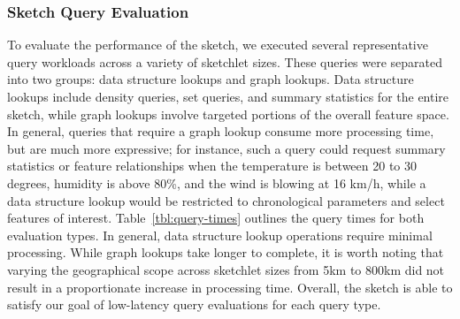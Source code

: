 \subsubsection{Sketch Query Evaluation}
To evaluate the performance of the sketch, we executed several representative query workloads across a variety of sketchlet sizes. These queries were separated into two groups: data structure lookups and graph lookups. Data structure lookups include density queries, set queries, and summary statistics for the entire sketch, while graph lookups involve targeted portions of the overall feature space. In general, queries that require a graph lookup consume more processing time, but are much more expressive; for instance, such a query could request summary statistics or feature relationships when the temperature is between 20 to 30 degrees, humidity is above 80\%, and the wind is blowing at 16 km/h, while a data structure lookup would be restricted to chronological parameters and select features of interest. Table~\ref{tbl:query-times} outlines the query times for both evaluation types. In general, data structure lookup operations require minimal processing. While graph lookups take longer to complete, it is worth noting that varying the geographical scope across sketchlet sizes from 5km to 800km did not result in a proportionate increase in processing time. Overall, the sketch is able to satisfy our goal of low-latency query evaluations for each query type.

